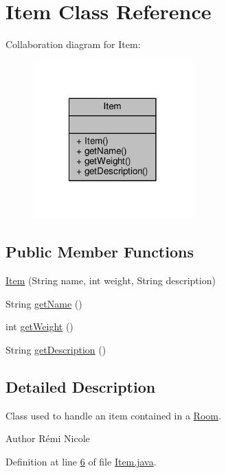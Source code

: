 \hypertarget{classItem}{\section{Item Class Reference}
\label{classItem}
}


Collaboration diagram for Item\-:
\nopagebreak
\begin{figure}[H]
\begin{center}
\leavevmode
\includegraphics[width=174pt]{classItem__coll__graph}
\end{center}
\end{figure}
\subsection*{Public Member Functions}
\begin{DoxyCompactItemize}
\item 
\hyperlink{classItem_acf7048ce82d4f6f047d926b1f6260f7c}{Item} (String name, int weight, String description)
\item 
String \hyperlink{classItem_a78dd5a8370c5267c3f1f992167ab84ac}{get\-Name} ()
\item 
int \hyperlink{classItem_a2ff9daec3cf9585fb5741062447a779d}{get\-Weight} ()
\item 
String \hyperlink{classItem_abfe361bd046f5acdf4946bda076a8c8f}{get\-Description} ()
\end{DoxyCompactItemize}


\subsection{Detailed Description}
Class used to handle an item contained in a \hyperlink{classRoom}{Room}. \begin{DoxyAuthor}{Author}
Rémi Nicole 
\end{DoxyAuthor}


Definition at line \hyperlink{Item_8java_source_l00006}{6} of file \hyperlink{Item_8java_source}{Item.\-java}.



